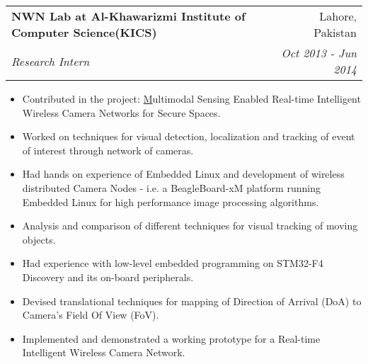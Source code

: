 \documentclass[letterpaper,11pt]{article}
\makeatletter
\newcommand{\resumeItem}[2]{
  \item\small{
    \textbf{#1}{#2 \vspace{-2pt}}
  }
}
\newcommand{\resumeSubheading}[4]{
  \vspace{-1pt}\item
    \begin{tabular*}{0.97\textwidth}{l@{\extracolsep{\fill}}r}
      \textbf{#1} & #2 \\
      \textit{\small#3} & \textit{\small #4} \\
    \end{tabular*}\vspace{-5pt}
}
\newcommand{\resumeItemListStart}{\begin{itemize}}
\newcommand{\resumeItemListEnd}{\end{itemize}\vspace{-5pt}}
\makeatother
\begin{document}
    \resumeSubheading
      {NWN Lab at Al-Khawarizmi Institute of Computer Science(KICS)}{Lahore, Pakistan}
      {Research Intern}{Oct 2013 - Jun 2014} 
      \resumeItemListStart
        \resumeItem{}
          {Contributed in the project: \href{https://www.ignite.org.pk/component/tprojects/project/22.html} Multimodal Sensing Enabled Real-time Intelligent Wireless Camera Networks for Secure Spaces.}
        \resumeItem{}
          {Worked on techniques for visual detection, localization and tracking of event of interest through network of cameras.}
        \resumeItem{}
          {Had hands on experience of Embedded Linux and development of wireless distributed Camera Nodes - i.e. a BeagleBoard-xM platform running Embedded Linux for high performance image processing algorithms.}
        \resumeItem{}
          {Analysis and comparison of different techniques for visual tracking of moving objects.}
        \resumeItem{}
          {Had experience with low-level embedded programming on STM32-F4 Discovery and its on-board peripherals.}
        \resumeItem{}
          {Devised translational techniques for mapping of Direction of Arrival (DoA) to Camera’s Field Of View (FoV).}
        \resumeItem{}
          {Implemented and demonstrated a working prototype for a Real-time Intelligent Wireless Camera Network.}
          


      \resumeItemListEnd

\end{document}
